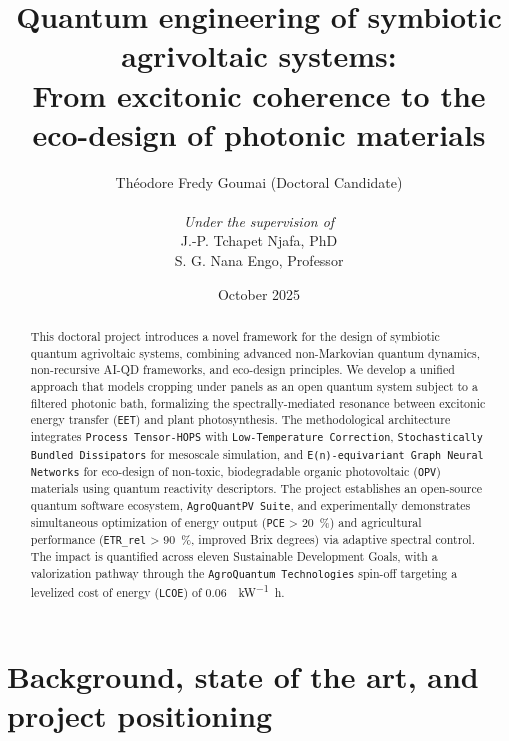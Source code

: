 \documentclass[12pt, a4paper]{article}
\begin{document}
\title{\huge Quantum engineering of symbiotic agrivoltaic systems:\\ From excitonic coherence to the eco-design of photonic materials}
\author{
    Théodore Fredy Goumai (Doctoral Candidate) \\
    \\
    \textit{Under the supervision of} \\
    J.-P. Tchapet Njafa, PhD \\
    S. G. Nana Engo, Professor
}
\date{October 2025}

\maketitle
\thispagestyle{empty}
\newpage

\begin{abstract}
This doctoral project introduces a novel framework for the design of symbiotic quantum agrivoltaic systems, combining advanced non-Markovian quantum dynamics, non-recursive AI-QD frameworks, and eco-design principles. We develop a unified approach that models cropping under panels as an open quantum system subject to a filtered photonic bath, formalizing the spectrally-mediated resonance between excitonic energy transfer (\texttt{EET}) and plant photosynthesis. The methodological architecture integrates \texttt{Process Tensor-HOPS} with \texttt{Low-Temperature Correction}, \texttt{Stochastically Bundled Dissipators} for mesoscale simulation, and \texttt{E(n)-equivariant Graph Neural Networks} for eco-design of non-toxic, biodegradable organic photovoltaic (\texttt{OPV}) materials using quantum reactivity descriptors. The project establishes an open-source quantum software ecosystem, \texttt{AgroQuantPV Suite}, and experimentally demonstrates simultaneous optimization of energy output (\texttt{PCE} > \SI{20}{\percent}) and agricultural performance (\texttt{ETR\_{rel}} > \SI{90}{\percent}, improved Brix degrees) via adaptive spectral control. The impact is quantified across eleven Sustainable Development Goals, with a valorization pathway through the \texttt{AgroQuantum Technologies} spin-off targeting a levelized cost of energy (\texttt{LCOE}) of \SI{0.06}{\dollar\per\kilo\watt\hour}.
\end{abstract}
\newpage

\tableofcontents
\newpage
\setcounter{page}{1}

\section{Background, state of the art, and project positioning}
\label{sec:background}
\end{document}
